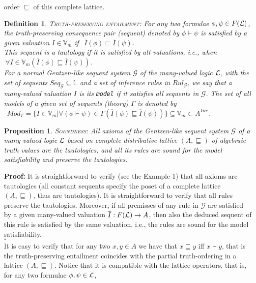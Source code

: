 \documentclass[10pt,twocolumn]{article}
\newcommand{\G}{\mathcal{G}} \renewcommand{\H}{\mathcal{H}}
\newtheorem{propo}{Proposition}
\newtheorem{definition}{Definition}
\begin{document}
 order $\sqsubseteq$ of this complete lattice.
 \begin{definition} \textsc{Truth-preserving entailment:}
 \label{def:entailment} For any two formulae $\phi, \psi \in F(\mathcal{L})$,
 the truth-preserving consequence pair (sequent) denoted by
 $\phi \vdash \psi$ is satisfied by a given valuation $I \in \mathbb{V}_m$ if $~~\overline{I}(\phi) \sqsubseteq \overline{I}(\psi)$.\\
  This sequent is a
 tautology if it is satisfied by all valuations, i.e., when
 $~\forall I \in \mathbb{V}_m (\overline{I}(\phi) \sqsubseteq \overline{I}(\psi))$.\\
 For a  normal Gentzen-like sequent system $\G $ of the many-valued logic $\mathcal{L}$, with the set of sequents $Seq_{\G} \subseteq
 \mathbb{L}$ and a set of inference rules in $Rul_{ \G}$, we say that a many-valued valuation $I$ is its \verb"model"
  if it satisfies all sequents in $\G$. The set of all models of
  a given set of sequents (theory) $\Gamma$ is denoted by
  $~~Mod_{\Gamma}  = \{I \in \mathbb{V}_m|\forall(\phi \vdash \psi) \in \Gamma(\overline{I}(\phi) \sqsubseteq \overline{I}(\psi))
  \} \subseteq \mathbb{V}_m \subset A^{Var}$.
 \end{definition}
  \begin{propo} \textsc{Soundness:} \label{prop:sound}
 All  axioms of the Gentzen-like sequent system $\G $  of a many-valued logic $\mathcal{L}$ based on complete distributive lattice
 $(A, \sqsubseteq)$ of algebraic truth values are the tautologies, and all its rules are sound for the model satisfiability and
 preserve the tautologies.
 \end{propo}
 \textbf{Proof:} It is straightforward to verify (see the Example 1) that all axioms are tautologies (all constant sequents
  specify the poset of a complete lattice $(A, \sqsubseteq)$, thus are tautologies). It is straightforward to verify that all rules preserve the tautologies.
  Moreover, if all premisses  of any rule in $\G$ are satisfied by a given many-valued valuation $\overline{I}:F(\mathcal{L})\rightarrow A$,
  then also the deduced sequent of this rule is satisfied by the same valuation, i.e., the rules are sound for the model satisfiability.
  \\$\square$ \\
 It is easy to verify that for any two $x,y \in A$ we have that $x
 \sqsubseteq y$ iff $x \vdash y$, that is the truth-preserving entailment
 coincides with the partial truth-ordering in a lattice $(A, \sqsubseteq)$.
 Notice that
it is compatible with the lattice operators, that is, for any two formulae $\phi, \psi \in \mathcal{L}$,
\end{document}
